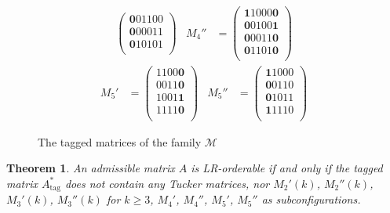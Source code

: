 \documentclass[12pt]{book}
\theoremstyle{plain}
\newtheorem{teo}{Theorem}[chapter]
\theoremstyle{remark}
\newcommand*{\tagg}{\mathrm{tag}}%
\begin{document}
\begin{figure}[h!]
{\begin{align*}
\begin{pmatrix}
					\pmb 0   0   1   1   0   0 \\
					\pmb 0   0   0   0   1   1 \\
					\pmb 0   1   0   1   0   1 \\
			\end{pmatrix}
			&
			M_4'' &= \begin{pmatrix}
					\pmb 1   1   0   0   0  \pmb 0  \\ 
					\pmb 0   0   1   0   0  \pmb 1  \\
					\pmb 0   0   0   1   1 \pmb 0  \\
					\pmb 0   1    1   0   1   \pmb 0 \\
			\end{pmatrix}		
	\end{align*}
	\begin{align*}	
			M_5' &= \begin{pmatrix}
					1   1   0   0   \pmb 0 \\ 
					0   0   1   1   \pmb 0 \\
					1   0   0   1   \pmb 1 \\
					1   1   1   1   \pmb 0 \\
			\end{pmatrix}
			&
			M_5'' &= \begin{pmatrix}
					  \pmb 1  1 0  0  0 \\ 
					  \pmb 0  0 1  1  0 \\
					  \pmb 0  1  0  1  1 \\
					  \pmb 1  1 1  1  0 \\
			\end{pmatrix}
	\end{align*}	
		}
	\caption{The tagged matrices of the family $\mathcal{M}$}  \label{fig:forb_LR-orderable_tags}
\end{figure}

\begin{teo} \label{teo:LR-orderable_caract_bymatrices}
	An admissible matrix $A$ is LR-orderable if and only if the tagged matrix $A^*_{\tagg}$ does not contain any Tucker matrices, nor $M_2'(k)$, $M_2''(k)$, $M_3'(k)$, $M_3''(k)$ for $k\geq 3$, $M_4'$, $M_4''$, $M_5'$, $M_5''$ as subconfigurations.  
\end{teo} 
\end{document}
